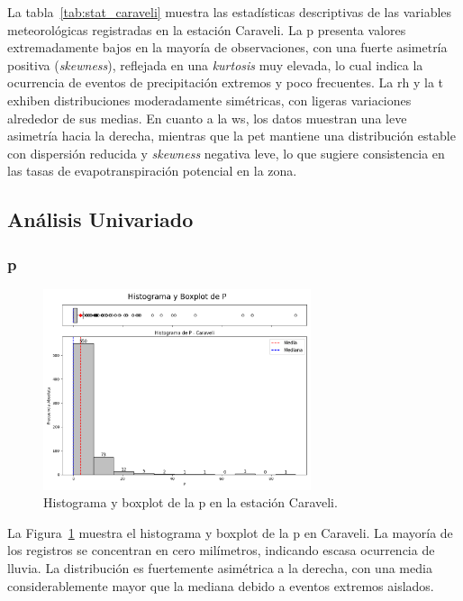 La tabla~\ref{tab:stat_caraveli} muestra las estadísticas descriptivas de las variables meteorológicas registradas en la estación Caraveli. La \gls{p} presenta valores extremadamente bajos en la mayoría de observaciones, con una fuerte asimetría positiva (\textit{skewness}), reflejada en una \textit{kurtosis} muy elevada, lo cual indica la ocurrencia de eventos de precipitación extremos y poco frecuentes. La \gls{rh} y la \gls{t} exhiben distribuciones moderadamente simétricas, con ligeras variaciones alrededor de sus medias. En cuanto a la \gls{ws}, los datos muestran una leve asimetría hacia la derecha, mientras que la \gls{pet} mantiene una distribución estable con dispersión reducida y \textit{skewness} negativa leve, lo que sugiere consistencia en las tasas de evapotranspiración potencial en la zona.

\subsection{Análisis Univariado}

\subsubsection*{\gls{p}}
\begin{figure}[htbp]
\centering
\includegraphics[width=0.7\textwidth]{resultados/por_estacion_meteorologica/Caraveli/P_histograma.png}
\caption{Histograma y boxplot de la \gls{p}  en la estación Caraveli.}
\label{fig:caraveli_P}
\end{figure}
La Figura~\ref{fig:caraveli_P} muestra el histograma y boxplot de la \gls{p} en Caraveli. La mayoría de los registros se concentran en cero milímetros, indicando escasa ocurrencia de lluvia. La distribución es fuertemente asimétrica a la derecha, con una media considerablemente mayor que la mediana debido a eventos extremos aislados.

